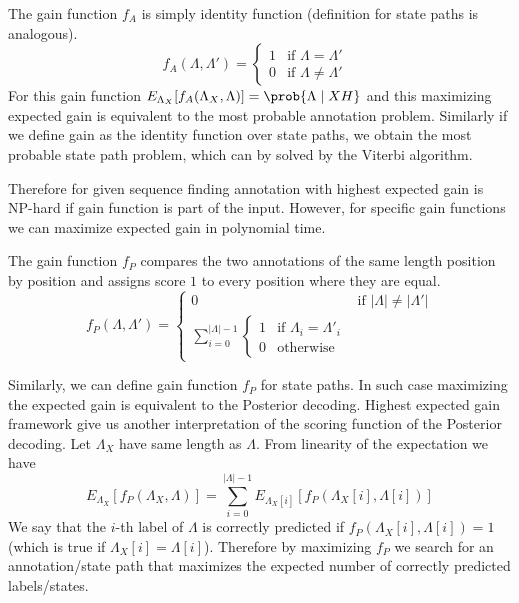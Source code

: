 The gain function $f_A$ is simply identity function (definition for state paths
is analogous).
\begin{equation}
f_A(\Lambda,\Lambda') = \begin{cases}
1 & \text{if $\Lambda = \Lambda'$ }\\
0 & \text{if $\Lambda \not=\Lambda'$}
\end{cases}
\end{equation}
For this gain function $E_{\Lambda_X}[f_A(\Lambda_X,\Lambda)]=\prob{\Lambda\mid
X H}$ and this
maximizing expected gain is 
equivalent to the most probable annotation problem. Similarly if we define gain
as the identity function over state paths, we obtain the most probable state
path problem, which can by solved by the Viterbi algorithm.

Therefore for given sequence finding annotation with highest expected gain is
NP-hard if gain function is part of the input. However, for specific gain
functions we can maximize expected gain in polynomial time.

The gain function $f_P$ compares the two annotations of the same length position
by position and assigns score $1$ to every position where they are equal.
\begin{equation}
f_P(\Lambda,\Lambda') = 
\begin{cases}
0 & \text{if $|\Lambda|\not=|\Lambda'|$}\\
\sum_{i=0}^{|\Lambda|-1}\begin{cases}
1 & \text{if $\Lambda_i=\Lambda'_i$}\\
0 & \text{otherwise}
\end{cases}
\end{cases}
\end{equation}

Similarly, we can define gain function $f_P$ for state paths. In such case
maximizing the expected gain is equivalent to the Posterior decoding. Highest
expected gain framework give us another interpretation of the scoring function of
the Posterior decoding. Let $\Lambda_X$  have same length as $\Lambda$. From
linearity of the expectation we have \[E_{\Lambda_X}[f_P(\Lambda_X,\Lambda)] =
\sum_{i=0}^{|\Lambda|-1}E_{\Lambda_X[i]}[f_P(\Lambda_X[i],\Lambda[i])]\] We say
that the $i$-th label of $\Lambda$ is correctly predicted if
$f_P(\Lambda_X[i],\Lambda[i])=1$ (which is true if $\Lambda_X[i]=\Lambda[i]$). Therefore  by maximizing $f_P$ we search for
an annotation/state path that maximizes the expected number of correctly
predicted labels/states.

